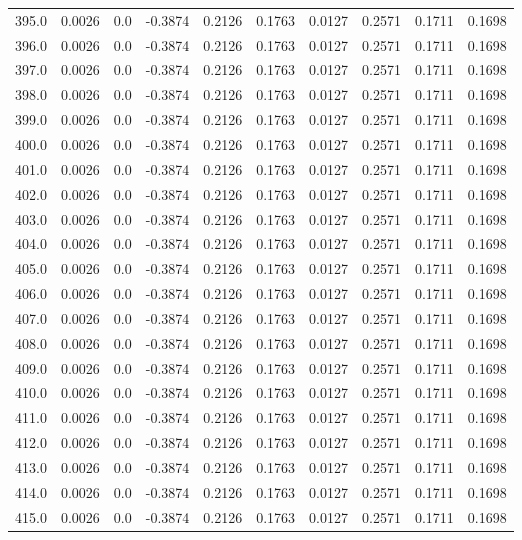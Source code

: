 \begin{longtable}{lrrrrrrrrr}
395.0 & 0.0026 & 0.0 & -0.3874 & 0.2126 & 0.1763 & 0.0127 & 0.2571 & 0.1711 & 0.1698 \\
396.0 & 0.0026 & 0.0 & -0.3874 & 0.2126 & 0.1763 & 0.0127 & 0.2571 & 0.1711 & 0.1698 \\
397.0 & 0.0026 & 0.0 & -0.3874 & 0.2126 & 0.1763 & 0.0127 & 0.2571 & 0.1711 & 0.1698 \\
398.0 & 0.0026 & 0.0 & -0.3874 & 0.2126 & 0.1763 & 0.0127 & 0.2571 & 0.1711 & 0.1698 \\
399.0 & 0.0026 & 0.0 & -0.3874 & 0.2126 & 0.1763 & 0.0127 & 0.2571 & 0.1711 & 0.1698 \\
400.0 & 0.0026 & 0.0 & -0.3874 & 0.2126 & 0.1763 & 0.0127 & 0.2571 & 0.1711 & 0.1698 \\
401.0 & 0.0026 & 0.0 & -0.3874 & 0.2126 & 0.1763 & 0.0127 & 0.2571 & 0.1711 & 0.1698 \\
402.0 & 0.0026 & 0.0 & -0.3874 & 0.2126 & 0.1763 & 0.0127 & 0.2571 & 0.1711 & 0.1698 \\
403.0 & 0.0026 & 0.0 & -0.3874 & 0.2126 & 0.1763 & 0.0127 & 0.2571 & 0.1711 & 0.1698 \\
404.0 & 0.0026 & 0.0 & -0.3874 & 0.2126 & 0.1763 & 0.0127 & 0.2571 & 0.1711 & 0.1698 \\
405.0 & 0.0026 & 0.0 & -0.3874 & 0.2126 & 0.1763 & 0.0127 & 0.2571 & 0.1711 & 0.1698 \\
406.0 & 0.0026 & 0.0 & -0.3874 & 0.2126 & 0.1763 & 0.0127 & 0.2571 & 0.1711 & 0.1698 \\
407.0 & 0.0026 & 0.0 & -0.3874 & 0.2126 & 0.1763 & 0.0127 & 0.2571 & 0.1711 & 0.1698 \\
408.0 & 0.0026 & 0.0 & -0.3874 & 0.2126 & 0.1763 & 0.0127 & 0.2571 & 0.1711 & 0.1698 \\
409.0 & 0.0026 & 0.0 & -0.3874 & 0.2126 & 0.1763 & 0.0127 & 0.2571 & 0.1711 & 0.1698 \\
410.0 & 0.0026 & 0.0 & -0.3874 & 0.2126 & 0.1763 & 0.0127 & 0.2571 & 0.1711 & 0.1698 \\
411.0 & 0.0026 & 0.0 & -0.3874 & 0.2126 & 0.1763 & 0.0127 & 0.2571 & 0.1711 & 0.1698 \\
412.0 & 0.0026 & 0.0 & -0.3874 & 0.2126 & 0.1763 & 0.0127 & 0.2571 & 0.1711 & 0.1698 \\
413.0 & 0.0026 & 0.0 & -0.3874 & 0.2126 & 0.1763 & 0.0127 & 0.2571 & 0.1711 & 0.1698 \\
414.0 & 0.0026 & 0.0 & -0.3874 & 0.2126 & 0.1763 & 0.0127 & 0.2571 & 0.1711 & 0.1698 \\
415.0 & 0.0026 & 0.0 & -0.3874 & 0.2126 & 0.1763 & 0.0127 & 0.2571 & 0.1711 & 0.1698 \\

\end{longtable}
